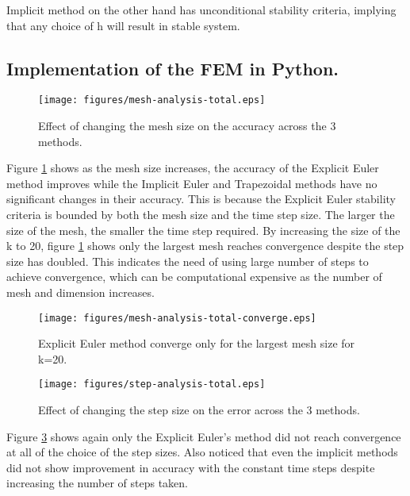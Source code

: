 \documentclass{article}
\begin{document}
Implicit method on the other hand has unconditional stability criteria, implying that any choice of h will result in stable system.







\subsection{Implementation of the FEM in Python.}%
\label{sub:Implementation of the FEM in Python.}
\begin{figure}[H]
  \centering
  \texttt{[image: figures/mesh-analysis-total.eps]}
  \caption{Effect of changing the mesh size on the accuracy across the 3 methods.}
  \label{fig:figures-mesh-analysis-total-eps}
\end{figure}

Figure \ref{fig:figures-mesh-analysis-total-eps} shows as the mesh size increases, the accuracy of the Explicit Euler method improves while the Implicit Euler and Trapezoidal methods have no significant changes in their accuracy. This is because the Explicit Euler stability criteria is bounded by both the mesh size and the time step size. The larger the size of the mesh, the smaller the time step required. By increasing the size of the k to 20, figure \ref{fig:figures-mesh-analysis-total-eps} shows only the largest mesh reaches convergence despite the step size has doubled. This indicates the need of using large number of steps to achieve convergence, which can be computational expensive as the number of mesh and dimension increases.

\begin{figure}[H]
  \centering
  \texttt{[image: figures/mesh-analysis-total-converge.eps]}
  \caption{Explicit Euler method converge only for the largest mesh size for k=20.}
  \label{fig:figures-mesh-analysis-total-converge-eps}
\end{figure}


\begin{figure}[H]
  \centering
  \texttt{[image: figures/step-analysis-total.eps]}
  \caption{Effect of changing the step size on the error across the 3 methods.}
  \label{fig:figures-step-analysis-total-eps}
\end{figure}
Figure \ref{fig:figures-step-analysis-total-eps} shows again only the Explicit Euler's method did not reach convergence at all of the choice of the step sizes. Also noticed that even the implicit methods did not show improvement in accuracy with the constant time steps despite increasing the number of steps taken.
\end{document}
